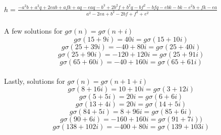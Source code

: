 \documentclass[12pt]{amsart}
\begin{document}
$h = \frac{-a^2b+a^2q+2eab+afk+aq-eaq-b^3+2b^2f+b^2q-bf^2-bfq-ebk-bk-e^2b+fk-ea}{a^2-2ea+b^2-2bf+f^2+e^2} $
\\
\\
A few solutions for $g\sigma(n) = g\sigma(n+i)$
\\
$$g\sigma(15 + 9i) = 40i = g\sigma(15 + 10i)$$
$$g\sigma(25 + 39i) = -40 + 80i  = g\sigma( 25 + 40i)$$
$$g\sigma(25 + 90i) = -120 + 120i  = g\sigma(25 + 91i)$$
$$g\sigma(65 + 60i) = -40 + 160i = g\sigma(65 + 61i)$$
\\
Lastly, solutions for $g\sigma(n) = g\sigma(n+1+i)$
\\
$$g\sigma(8 + 16i) = 10 + 10i = g\sigma(3 + 12i)$$
$$g\sigma(5 + 5i) = 20i = g\sigma(6 + 6i)$$
$$g\sigma(13 + 4i) = 20i = g\sigma(14 + 5i)$$
$$g\sigma(84 + 5i) = 8 + 96i  = g\sigma(85 + 6i)$$
$$g\sigma(90 + 6i) = -160 + 160i  = g\sigma(91 + 7i))$$
$$g\sigma(138 + 102i) = -400 + 80i = g\sigma(139 + 103i)$$
\end{document}
